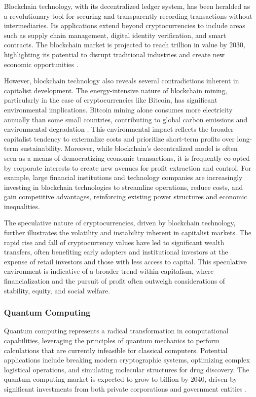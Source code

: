 \begin{refsection}
Blockchain technology, with its decentralized ledger system, has been heralded as a revolutionary tool for securing and transparently recording transactions without intermediaries. Its applications extend beyond cryptocurrencies to include areas such as supply chain management, digital identity verification, and smart contracts. The blockchain market is projected to reach  trillion in value by 2030, highlighting its potential to disrupt traditional industries and create new economic opportunities \cite[pp.~15-17]{tapscott2016blockchain}.

However, blockchain technology also reveals several contradictions inherent in capitalist development. The energy-intensive nature of blockchain mining, particularly in the case of cryptocurrencies like Bitcoin, has significant environmental implications. Bitcoin mining alone consumes more electricity annually than some small countries, contributing to global carbon emissions and environmental degradation \cite[pp.~100-102]{narayanan2016bitcoin}. This environmental impact reflects the broader capitalist tendency to externalize costs and prioritize short-term profits over long-term sustainability. Moreover, while blockchain's decentralized model is often seen as a means of democratizing economic transactions, it is frequently co-opted by corporate interests to create new avenues for profit extraction and control. For example, large financial institutions and technology companies are increasingly investing in blockchain technologies to streamline operations, reduce costs, and gain competitive advantages, reinforcing existing power structures and economic inequalities.

The speculative nature of cryptocurrencies, driven by blockchain technology, further illustrates the volatility and instability inherent in capitalist markets. The rapid rise and fall of cryptocurrency values have led to significant wealth transfers, often benefiting early adopters and institutional investors at the expense of retail investors and those with less access to capital. This speculative environment is indicative of a broader trend within capitalism, where financialization and the pursuit of profit often outweigh considerations of stability, equity, and social welfare.

\subsubsection{Quantum Computing}

Quantum computing represents a radical transformation in computational capabilities, leveraging the principles of quantum mechanics to perform calculations that are currently infeasible for classical computers. Potential applications include breaking modern cryptographic systems, optimizing complex logistical operations, and simulating molecular structures for drug discovery. The quantum computing market is expected to grow to  billion by 2040, driven by significant investments from both private corporations and government entities \cite[pp.~23-25]{biamonte2017quantum}.


\end{refsection}
